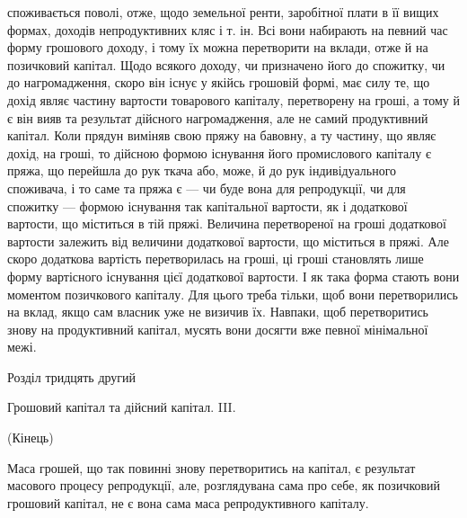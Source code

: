 споживається поволі, отже, щодо земельної ренти, заробітної плати в її вищих
формах, доходів непродуктивних кляс і т. ін. Всі вони набирають на певний
час форму грошового доходу, і тому їх можна перетворити на вклади, отже
й на позичковий капітал. Щодо всякого доходу, чи призначено його до спожитку,
чи до нагромадження, скоро він існує у якійсь грошовій формі, має
силу те, що дохід являє частину вартости товарового капіталу, перетворену на
гроші, а тому й є він вияв та результат дійсного нагромадження, але не самий
продуктивний капітал. Коли прядун виміняв свою пряжу на бавовну, а ту частину,
що являє дохід, на гроші, то дійсною формою існування його промислового
капіталу є пряжа, що перейшла до рук ткача або, може, й до рук індивідуального
споживача, і то саме та пряжа є — чи буде вона для репродукції, чи
для спожитку — формою існування так капітальної вартости, як і додаткової
вартости, що міститься в тій пряжі. Величина перетвореної на гроші додаткової
вартости залежить від величини додаткової вартости, що міститься в пряжі.
Але скоро додаткова вартість перетворилась на гроші, ці гроші становлять лише
форму вартісного існування цієї додаткової вартости. І як така форма стають
вони моментом позичкового капіталу. Для цього треба тільки, щоб вони перетворились
на вклад, якщо сам власник уже не визичив їх. Навпаки, щоб
перетворитись знову на продуктивний капітал, мусять вони досягти вже певної
мінімальної межі.

Розділ тридцять другий

Грошовий капітал та дійсний капітал. III.

(Кінець)

Маса грошей, що так повинні знову перетворитись на капітал, є результат
масового процесу репродукції, але, розглядувана сама про себе, як позичковий
грошовий капітал, не є вона сама маса репродуктивного капіталу.


